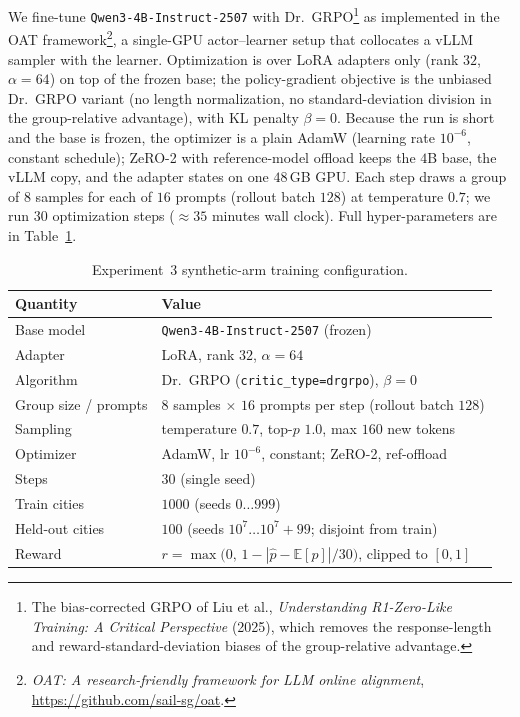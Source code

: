 \documentclass{article} %
\begin{document}
We fine-tune \texttt{Qwen3-4B-Instruct-2507} with Dr.\ GRPO\footnote{The bias-corrected GRPO of Liu
et al., \emph{Understanding R1-Zero-Like Training: A Critical Perspective} (2025), which removes the
response-length and reward-standard-deviation biases of the group-relative advantage.} as implemented
in the OAT framework\footnote{\emph{OAT: A research-friendly framework for LLM online alignment},
\url{https://github.com/sail-sg/oat}.}, a single-GPU actor--learner setup that collocates a vLLM
sampler with the learner.
Optimization is over LoRA adapters only (rank $32$, $\alpha{=}64$) on top of the frozen base; the
policy-gradient objective is the unbiased Dr.\ GRPO variant (no length normalization, no
standard-deviation division in the group-relative advantage), with KL penalty $\beta{=}0$.  Because
the run is short and the base is frozen, the optimizer is a plain AdamW (learning rate $10^{-6}$,
constant schedule); ZeRO-2 with reference-model offload keeps the $4$B base, the vLLM copy, and the
adapter states on one $48$\,GB GPU.  Each step draws a group of $8$ samples for each of $16$ prompts
(rollout batch $128$) at temperature $0.7$; we run $30$ optimization steps ($\approx35$ minutes wall
clock).  Full hyper-parameters are in Table~\ref{tab:exp3-hparams}.

\begin{table}[h]
\centering
\caption{Experiment~3 synthetic-arm training configuration.}
\label{tab:exp3-hparams}
\small
\begin{tabular}{ll}
\toprule
\textbf{Quantity} & \textbf{Value} \\
\midrule
Base model              & \texttt{Qwen3-4B-Instruct-2507} (frozen) \\
Adapter                 & LoRA, rank $32$, $\alpha{=}64$ \\
Algorithm               & Dr.\ GRPO (\texttt{critic\_type=drgrpo}), $\beta{=}0$ \\
Group size / prompts    & $8$ samples $\times$ $16$ prompts per step (rollout batch $128$) \\
Sampling                & temperature $0.7$, top-$p$ $1.0$, max $160$ new tokens \\
Optimizer               & AdamW, lr $10^{-6}$, constant; ZeRO-2, ref-offload \\
Steps                   & $30$ (single seed) \\
Train cities            & $1000$ (seeds $0\ldots999$) \\
Held-out cities         & $100$ (seeds $10^{7}\ldots10^{7}{+}99$; disjoint from train) \\
Reward                  & $r=\max\!\big(0,\,1-|\hat p-\mathbb E[p]|/30\big)$, clipped to $[0,1]$ \\
\bottomrule
\end{tabular}
\end{table}
\end{document}
